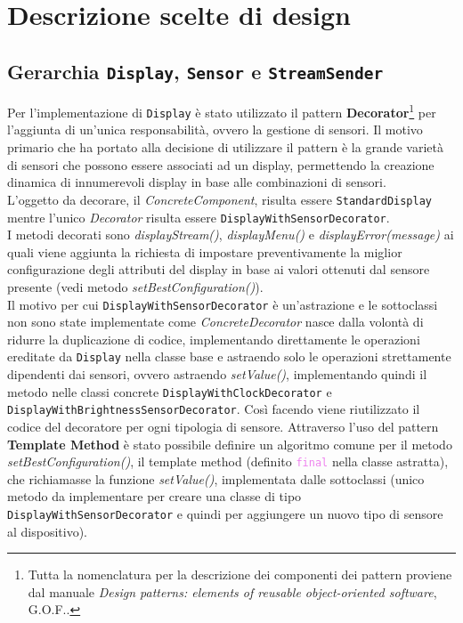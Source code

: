 \documentclass[a4paper,11pt]{article}
\begin{document}
	\section{Descrizione scelte di design}
	\subsection{Gerarchia \texttt{Display}, \texttt{Sensor} e \texttt{StreamSender}}
	Per l'implementazione di \texttt{Display} è stato utilizzato il pattern \textbf{Decorator}\footnote{Tutta la nomenclatura per la descrizione dei componenti dei pattern proviene dal manuale \textit{Design patterns: elements of reusable object-oriented software}, {\selectfont G.O.F.}.} per l'aggiunta di un'unica responsabilità, ovvero la gestione di sensori. Il motivo primario che ha portato alla decisione di utilizzare il pattern è la grande varietà di sensori che possono essere associati ad un display, permettendo la creazione dinamica di innumerevoli display in base alle combinazioni di sensori.\\
	L'oggetto da decorare, il \textit{ConcreteComponent}, risulta essere \texttt{StandardDisplay} mentre l'unico \textit{Decorator} risulta essere \texttt{DisplayWithSensorDecorator}.\\
	I metodi decorati sono \textit{displayStream()}, \textit{displayMenu()} e \textit{displayError(message)} ai quali viene aggiunta la richiesta di impostare preventivamente la miglior configurazione degli attributi del display in base ai valori ottenuti dal sensore presente (vedi metodo \textit{setBestConfiguration()}).\\
	Il motivo per cui \texttt{DisplayWithSensorDecorator} è un'astrazione e le sottoclassi non sono state implementate come \textit{ConcreteDecorator} nasce dalla volontà di ridurre la duplicazione di codice, implementando direttamente le operazioni ereditate da \texttt{Display} nella classe base e astraendo solo le operazioni strettamente dipendenti dai sensori, ovvero astraendo \textit{setValue()}, implementando quindi il metodo nelle classi concrete \texttt{DisplayWithClockDecorator} e \texttt{DisplayWithBrightnessSensorDecorator}. Così facendo viene riutilizzato il codice del decoratore per ogni tipologia di sensore. Attraverso l'uso del pattern \textbf{Template Method} è stato possibile definire un algoritmo comune per il metodo \textit{setBestConfiguration()}, il template method (definito \textcolor{violet}{\texttt{final}} nella classe astratta), che richiamasse la funzione \textit{setValue()}, implementata dalle sottoclassi (unico metodo da implementare per creare una classe di tipo \texttt{DisplayWithSensorDecorator} e quindi per aggiungere un nuovo tipo di sensore al dispositivo).\\
\end{document}
